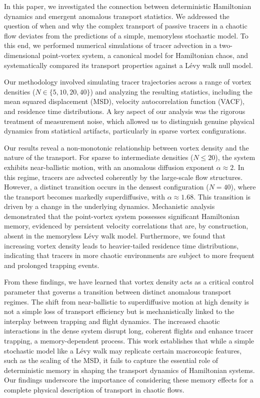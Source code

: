 \documentclass[]{article}
\begin{document}
In this paper, we investigated the connection between deterministic Hamiltonian dynamics and emergent anomalous transport statistics. We addressed the question of when and why the complex transport of passive tracers in a chaotic flow deviates from the predictions of a simple, memoryless stochastic model. To this end, we performed numerical simulations of tracer advection in a two-dimensional point-vortex system, a canonical model for Hamiltonian chaos, and systematically compared its transport properties against a L\'evy walk null model.

Our methodology involved simulating tracer trajectories across a range of vortex densities ($N \in \{5, 10, 20, 40\}$) and analyzing the resulting statistics, including the mean squared displacement (MSD), velocity autocorrelation function (VACF), and residence time distributions. A key aspect of our analysis was the rigorous treatment of measurement noise, which allowed us to distinguish genuine physical dynamics from statistical artifacts, particularly in sparse vortex configurations.

Our results reveal a non-monotonic relationship between vortex density and the nature of the transport. For sparse to intermediate densities ($N \le 20$), the system exhibits near-ballistic motion, with an anomalous diffusion exponent $\alpha \approx 2$. In this regime, tracers are advected coherently by the large-scale flow structures. However, a distinct transition occurs in the densest configuration ($N=40$), where the transport becomes markedly superdiffusive, with $\alpha \approx 1.68$. This transition is driven by a change in the underlying dynamics. Mechanistic analysis demonstrated that the point-vortex system possesses significant Hamiltonian memory, evidenced by persistent velocity correlations that are, by construction, absent in the memoryless L\'evy walk model. Furthermore, we found that increasing vortex density leads to heavier-tailed residence time distributions, indicating that tracers in more chaotic environments are subject to more frequent and prolonged trapping events.

From these findings, we have learned that vortex density acts as a critical control parameter that governs a transition between distinct anomalous transport regimes. The shift from near-ballistic to superdiffusive motion at high density is not a simple loss of transport efficiency but is mechanistically linked to the interplay between trapping and flight dynamics. The increased chaotic interactions in the dense system disrupt long, coherent flights and enhance tracer trapping, a memory-dependent process. This work establishes that while a simple stochastic model like a L\'evy walk may replicate certain macroscopic features, such as the scaling of the MSD, it fails to capture the essential role of deterministic memory in shaping the transport dynamics of Hamiltonian systems. Our findings underscore the importance of considering these memory effects for a complete physical description of transport in chaotic flows.
\end{document}
